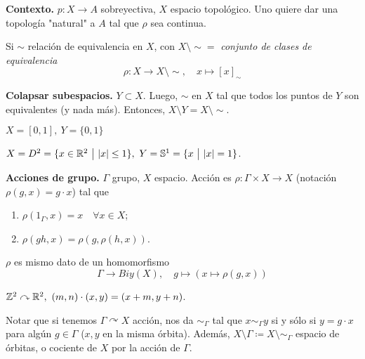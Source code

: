 
\noindent \textbf{Contexto.} $p:X \to A$ sobreyectiva, $X$ espacio topológico. Uno quiere dar una topología "natural" a $A$ tal que $\rho$ sea continua.

\begin{eg}[estándar]
	Si $\sim$ relación de equivalencia en $X$, con $X \setminus \sim =$ \textit{conjunto de clases de equivalencia}
	\[ \rho : X \to X \setminus \sim,\quad x \mapsto [x]_{\sim} \]
\end{eg}

\begin{eg}[1.] 
	\textbf{Colapsar subespacios.} $Y \subset X$. Luego, $\sim$ en $X$ tal que todos los puntos de $Y$ son equivalentes (y nada más). Entonces, $X \setminus Y = X \setminus \sim$. \newline
\end{eg}

\begin{eg}[1.1]
	$X = [0,1],\ Y = \{0,1\}$ \newline
\end{eg}

\begin{eg}[1.2]
	$X = D^2 = \{x\in\mathbb{R}^2 \ \big| \ |x|\leq 1 \},\ Y = \mathbb{S}^1 = \{x \ \big| \ |x| = 1\}$. \newline
\end{eg}

\begin{eg}[2.]
	\textbf{Acciones de grupo.} $\Gamma$ grupo, $X$ espacio. Acción es $\rho : \Gamma \times X \to X$ (notación $\rho(g,x) = g\cdot x$) tal que
	\begin{enumerate}
		\item $\rho(1_{\Gamma},x) = x \quad \forall x \in X$;

		\item $\rho(gh,x) = \rho(g,\rho(h,x))$.
	\end{enumerate}
\end{eg}

\begin{observe}
	$\rho$ es mismo dato de un homomorfismo
	\[ \Gamma \to Biy(X),\quad g \mapsto (x \mapsto \rho(g,x)) \]
\end{observe}

\begin{eg}
	$\Z^2 \curvearrowright \R^2,\ (m,n)\cdot(x,y) = (x+m,y+n)$.
\end{eg}

Notar que si tenemos $\Gamma \curvearrowright X$ acción, nos da $\sim_{\Gamma}$ tal que $x \sim_{\Gamma} y$ si y sólo si $y = g\cdot x$ para algún $g \in \Gamma$ ($x,y$ en la misma órbita). Además, $X \setminus \Gamma \coloneq X \setminus \sim_{\Gamma}$ espacio de órbitas, o cociente de $X$ por la acción de $\Gamma$. \newline


